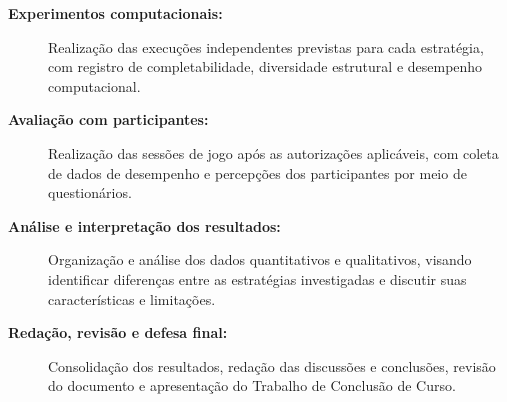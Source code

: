 \begin{description}
  \item[\textbf{Experimentos computacionais:}]
  Realização das execuções independentes previstas para cada estratégia, com 
  registro de completabilidade, diversidade estrutural e desempenho 
  computacional.

  \item[\textbf{Avaliação com participantes:}]
  Realização das sessões de jogo após as autorizações aplicáveis, com coleta de
  dados de desempenho e percepções dos participantes por meio de questionários.

  \item[\textbf{Análise e interpretação dos resultados:}]
  Organização e análise dos dados quantitativos e qualitativos, visando 
  identificar diferenças entre as estratégias investigadas e discutir suas 
  características e limitações.

  \item[\textbf{Redação, revisão e defesa final:}]
  Consolidação dos resultados, redação das discussões e conclusões, revisão do 
  documento e apresentação do Trabalho de Conclusão de Curso.

\end{description}
